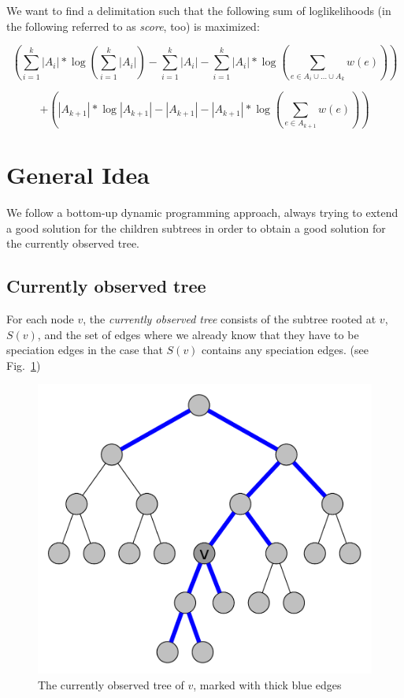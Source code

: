 \documentclass{llncs}
\begin{document}
We want to find a delimitation such that the following sum of loglikelihoods (in the following referred to as \emph{score}, too) is maximized:

$$\left(\sum_{i=1}^{k}{|A_i|} * \log\left(\sum_{i=1}^{k}{|A_i|}\right) - \sum_{i=1}^{k}{|A_i|} - \sum_{i=1}^{k}{|A_i|} * \log \left( \sum_{e \in A_i \cup \ldots \cup A_k}{w(e)} \right)\right)$$

$$ + \left(|A_{k+1}| * \log |A_{k+1}| - |A_{k+1}| - |A_{k+1}| * \log\left( \sum_{e \in A_{k+1}}{w(e)} \right) \right)$$

\section{General Idea}

We follow a bottom-up dynamic programming approach, always trying to extend a good solution for the children subtrees in order to obtain a good solution for the currently observed tree.

\subsection{Currently observed tree}

For each node $v$, the \emph{currently observed tree} consists of the subtree rooted at $v$, $S(v)$, and the set of edges where we already know that they have to be speciation edges in the case that $S(v)$ contains any speciation edges. (see Fig.~\ref{fig:currently_observed_tree})

\begin{figure}[h!]
	\centering
	\includegraphics[scale=0.4]{images/currently_observed_tree.pdf}
	\caption{The currently observed tree of $v$, marked with thick blue edges}
	\label{fig:currently_observed_tree}
\end{figure}
\end{document}
